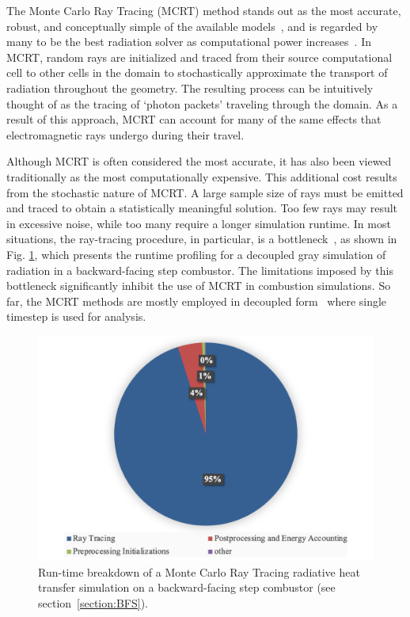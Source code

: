 The Monte Carlo Ray Tracing (MCRT) method stands out as the most accurate, robust, and conceptually simple of the available models~\cite{Tesse2002RadiativeApproach,Modest2013RadiativeTransfer,Coelho2018RadiativeSystems}, and is regarded by many to be the best radiation solver as computational power increases~\cite{Howell2010ThermalTransfer}.
In MCRT, random rays are initialized and traced from their source computational cell to other cells in the domain to stochastically approximate the transport of radiation throughout the geometry.
The resulting process can be intuitively thought of as the tracing of `photon packets' traveling through the domain.
As a result of this approach, MCRT can account for many of the same effects that electromagnetic rays undergo during their travel.

Although MCRT is often considered the most accurate, it has also been viewed traditionally as the most computationally expensive.
This additional cost results from the stochastic nature of MCRT. A large sample size of rays must be emitted and traced to obtain a statistically meaningful solution. 
Too few rays may result in excessive noise, while too many require a longer simulation runtime. In most situations, the ray-tracing procedure, in particular, is a bottleneck~\cite{Galtier2013IntegralAlgorithms}, as shown in Fig. \ref{fig:Sample_Profiling}, which presents the runtime profiling for a decoupled gray simulation of radiation in a backward-facing step combustor.
The limitations imposed by this bottleneck significantly inhibit the use of MCRT in combustion simulations. So far, the MCRT methods are mostly employed in decoupled form~\cite{Modest2022ChapterMedia} where single timestep is used for analysis. 

\begin{figure}
\centering
\includegraphics[width=0.8\linewidth]{figures/ch1/BFS_profiling.png}
\caption{Run-time breakdown of a Monte Carlo Ray Tracing radiative heat transfer simulation on a backward-facing step combustor (see section~\ref{section:BFS}).}
\label{fig:Sample_Profiling}
\end{figure}


